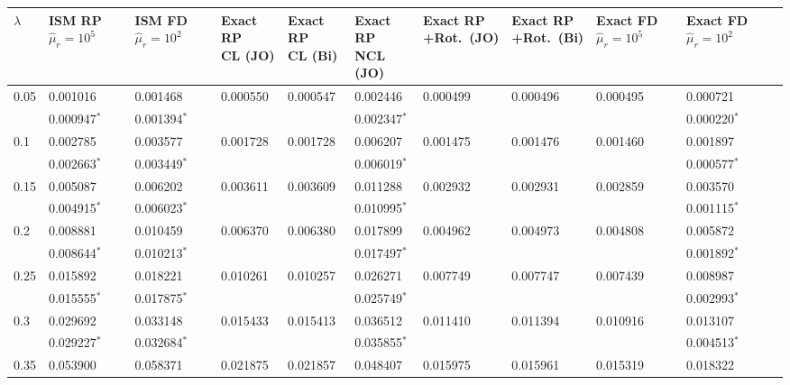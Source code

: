 \documentclass[../thesis.tex]{subfiles}
\begin{document}
\begin{landscape}
\newpage

\begin{longtable}{lllllllllll}%
\captionsetup{width=1.35\textwidth}
 \hline
 $\lambda$ & \makecell[l]{ISM RP\\$\hat{\mu}_r=10^5$} & \makecell[l]{ISM FD\\$\hat{\mu}_r=10^2$} & \makecell[l]{Exact RP\\CL (JO)} & \makecell[l]{Exact RP\\CL (Bi)} & \makecell[l]{Exact RP\\NCL (JO)} & \makecell[l]{Exact RP\\+Rot.\ (JO)} & \makecell[l]{Exact RP\\+Rot.\ (Bi)} & \makecell[l]{Exact FD\\$\hat{\mu}_r=10^5$} & \makecell[l]{Exact FD\\$\hat{\mu}_r=10^2$}
 \\\hline
 0.05 & 0.001016 & 0.001468 & 0.000550 & 0.000547 & 0.002446 & 0.000499 & 0.000496 & 0.000495 & 0.000721
 \\
 & 0.000947$^*$ & 0.001394$^*$ & & & 0.002347$^*$ & & & & 0.000220$^*$
 \\
 0.1 & 0.002785 & 0.003577 & 0.001728 & 0.001728 & 0.006207 & 0.001475 & 0.001476 & 0.001460 & 0.001897
 \\
 & 0.002663$^*$ & 0.003449$^*$ & & & 0.006019$^*$ & & & & 0.000577$^*$
 \\
 0.15 & 0.005087 & 0.006202 & 0.003611 & 0.003609 & 0.011288 & 0.002932 & 0.002931 & 0.002859 & 0.003570
 \\
 & 0.004915$^*$ & 0.006023$^*$ & & & 0.010995$^*$ & & & & 0.001115$^*$
 \\
 0.2 & 0.008881 & 0.010459 & 0.006370 & 0.006380 & 0.017899 & 0.004962 & 0.004973 & 0.004808 & 0.005872
 \\
 & 0.008644$^*$ & 0.010213$^*$ & & & 0.017497$^*$ & & & & 0.001892$^*$
 \\
 0.25 & 0.015892 & 0.018221 & 0.010261 & 0.010257 & 0.026271 & 0.007749 & 0.007747 & 0.007439 & 0.008987
 \\
 & 0.015555$^*$ & 0.017875$^*$ & & & 0.025749$^*$ & & & & 0.002993$^*$
 \\
 0.3 & 0.029692 & 0.033148 & 0.015433 & 0.015413 & 0.036512 & 0.011410 & 0.011394 & 0.010916 & 0.013107
 \\
 & 0.029227$^*$ & 0.032684$^*$ & & & 0.035855$^*$ & & & & 0.004513$^*$
 \\
 0.35 & 0.053900 & 0.058371 & 0.021875 & 0.021857 & 0.048407 & 0.015975 & 0.015961 & 0.015319 & 0.018322

\end{longtable}
\end{landscape}
\end{document}

